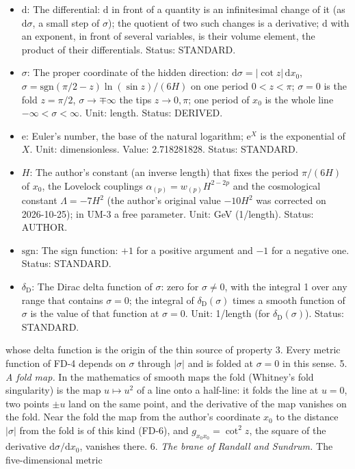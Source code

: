 \documentclass[
  10pt,
]{article}
\providecommand{\tightlist}{%
  \setlength{\itemsep}{0pt}\setlength{\parskip}{0pt}}
\begin{document}
\begin{itemize}
\tightlist
\item
  \(\mathrm{d}\): The differential: \(\mathrm{d}\) in front of a
  quantity is an infinitesimal change of it (as \(\mathrm{d}\sigma\), a
  small step of \(\sigma\)); the quotient of two such changes is a
  derivative; \(\mathrm{d}\) with an exponent, in front of several
  variables, is their volume element, the product of their
  differentials. Status: STANDARD.
\item
  \(\sigma\): The proper coordinate of the hidden direction:
  \(\mathrm{d}\sigma = \lvert\cot z\rvert\,\mathrm{d}x_0\),
  \(\sigma = \mathrm{sgn}(\pi/2 - z)\ln(\sin z)/(6H)\) on one period
  \(0 < z < \pi\); \(\sigma = 0\) is the fold \(z = \pi/2\),
  \(\sigma \to \mp\infty\) the tips \(z \to 0, \pi\); one period of
  \(x_0\) is the whole line \(-\infty < \sigma < \infty\). Unit: length.
  Status: DERIVED.
\item
  \(\mathrm{e}\): Euler's number, the base of the natural logarithm;
  \(\mathrm{e}^{X}\) is the exponential of \(X\). Unit: dimensionless.
  Value: 2.718281828. Status: STANDARD.
\item
  \(H\): The author's constant (an inverse length) that fixes the period
  \(\pi/(6H)\) of \(x_0\), the Lovelock couplings
  \(\alpha_{(p)} = w_{(p)}H^{2-2p}\) and the cosmological constant
  \(\Lambda = -7H^2\) (the author's original value \(-10H^2\) was
  corrected on 2026-10-25); in UM-3 a free parameter. Unit: GeV
  (1/length). Status: AUTHOR.
\item
  \(\mathrm{sgn}\): The sign function: \(+1\) for a positive argument
  and \(-1\) for a negative one. Status: STANDARD.
\item
  \(\delta_{\mathrm{D}}\): The Dirac delta function of \(\sigma\): zero
  for \(\sigma \ne 0\), with the integral 1 over any range that contains
  \(\sigma = 0\); the integral of \(\delta_{\mathrm{D}}(\sigma)\) times
  a smooth function of \(\sigma\) is the value of that function at
  \(\sigma = 0\). Unit: 1/length (for \(\delta_{\mathrm{D}}(\sigma)\)).
  Status: STANDARD.
\end{itemize}

whose delta function is the origin of the thin source of property 3.
Every metric function of FD-4 depends on \(\sigma\) through
\(\lvert\sigma\rvert\) and is folded at \(\sigma = 0\) in this sense. 5.
\emph{A fold map.} In the mathematics of smooth maps the fold (Whitney's
fold singularity) is the map \(u \mapsto u^2\) of a line onto a
half-line: it folds the line at \(u = 0\), two points \(\pm u\) land on
the same point, and the derivative of the map vanishes on the fold. Near
the fold the map from the author's coordinate \(x_0\) to the distance
\(\lvert\sigma\rvert\) from the fold is of this kind (FD-6), and
\(g_{x_0x_0} = \cot^2z\), the square of the derivative
\(\mathrm{d}\sigma/\mathrm{d}x_0\), vanishes there. 6. \emph{The brane
of Randall and Sundrum.} The five-dimensional metric
\end{document}

